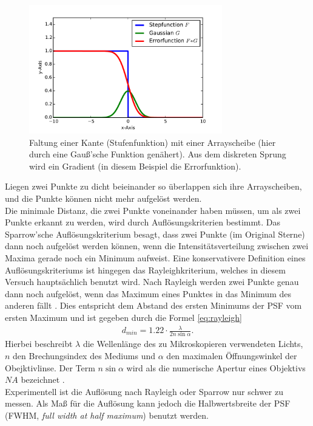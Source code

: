 \begin{figure}
	\centering
	\includegraphics[width=0.75\textwidth]{plots/convolve.pdf}
	\caption{Faltung einer Kante (Stufenfunktion) mit einer Arrayscheibe (hier durch eine Gauß'sche Funktion genähert). Aus dem diskreten Sprung wird ein Gradient (in diesem Beispiel die Errorfunktion).}\label{fig:convolution}
\end{figure}
Liegen zwei Punkte zu dicht beieinander so überlappen sich ihre Arrayscheiben, und die Punkte können nicht mehr aufgelöst werden.\\
Die minimale Distanz, die zwei Punkte voneinander haben müssen, um als zwei Punkte erkannt zu werden, wird durch Auflösungskriterien bestimmt.
Das Sparrow'sche Auflösungskriterium \cite{sparrow} besagt, dass zwei Punkte (im Original Sterne) dann noch aufgelöst werden können, wenn die Intensitätsverteilung zwischen zwei Maxima gerade noch ein Minimum aufweist.
Eine konservativere Definition eines Auflösungskriteriums ist hingegen das Rayleighkriterium, welches in diesem Versuch hauptsächlich benutzt wird.
Nach Rayleigh werden zwei Punkte genau dann noch aufgelöst, wenn das Maximum eines Punktes in das Minimum des anderen fällt \cite{Dem2}.
Dies entspricht dem Abstand des ersten Minimums der PSF vom ersten Maximum und ist gegeben durch die Formel \ref{eq:rayleigh}
\begin{align}
	d_{min} = 1.22\cdot \frac{\lambda}{2n\sin \alpha}. \label{eq:rayleigh}
\end{align}
Hierbei beschreibt $\lambda$ die Wellenlänge des zu Mikroskopieren verwendeten Lichts, $n$ den Brechungsindex des Mediums und $\alpha$ den maximalen Öffnungswinkel der Obejktivlinse.
Der Term $n\sin\alpha$ wird als die numerische Apertur eines Objektivs $NA$ bezeichnet \cite{Born}.
\\
Experimentell ist die Auflösung nach Rayleigh oder Sparrow nur schwer zu messen. 
Als Maß für die Auflösung kann jedoch die Halbwertsbreite der PSF (FWHM, \emph{full width at half maximum}) benutzt werden. 
